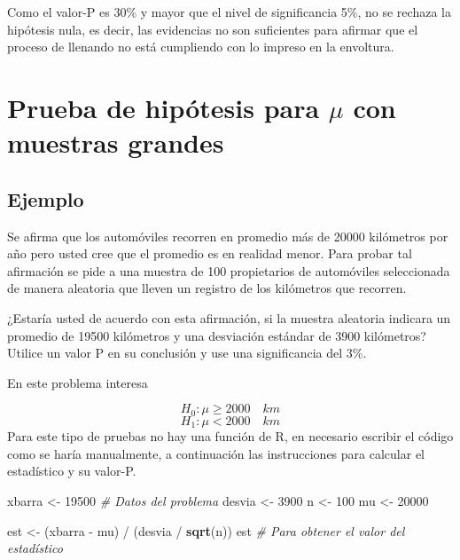 \documentclass[10pt,]{krantz}
\makeatletter
\newenvironment{Shaded}{\begin{snugshade}}{\end{snugshade}}
\newcommand{\KeywordTok}[1]{\textcolor[rgb]{0.13,0.29,0.53}{\textbf{{#1}}}}
\newcommand{\DecValTok}[1]{\textcolor[rgb]{0.00,0.00,0.81}{{#1}}}
\newcommand{\StringTok}[1]{\textcolor[rgb]{0.31,0.60,0.02}{{#1}}}
\newcommand{\CommentTok}[1]{\textcolor[rgb]{0.56,0.35,0.01}{\textit{{#1}}}}
\newcommand{\NormalTok}[1]{{#1}}
\let\proglang=\textsf
\newenvironment{kframe}{%
\medskip{}
\setlength{\fboxsep}{.8em}
 \def\at@end@of@kframe{}%
 \ifinner\ifhmode%
  \def\at@end@of@kframe{\end{minipage}}%
  \begin{minipage}{\columnwidth}%
 \fi\fi%
 \def\FrameCommand##1{\hskip\@totalleftmargin \hskip-\fboxsep
 \colorbox{shadecolor}{##1}\hskip-\fboxsep
     \hskip-\linewidth \hskip-\@totalleftmargin \hskip\columnwidth}%
 \MakeFramed {\advance\hsize-\width
   \@totalleftmargin\z@ \linewidth\hsize
   \@setminipage}}%
 {\par\unskip\endMakeFramed%
 \at@end@of@kframe}
\renewenvironment{Shaded}{\begin{kframe}}{\end{kframe}}
\makeatother
\begin{document}
Como el valor-P es 30\% y mayor que el nivel de significancia 5\%, no se
rechaza la hipótesis nula, es decir, las evidencias no son suficientes
para afirmar que el proceso de llenando no está cumpliendo con lo
impreso en la envoltura.

\section{\texorpdfstring{Prueba de hipótesis para \(\mu\) con muestras
grandes}{Prueba de hipótesis para \textbackslash{}mu con muestras grandes}}\label{prueba-de-hipotesis-para-mu-con-muestras-grandes}

\subsection*{Ejemplo}\label{ejemplo-62}


Se afirma que los automóviles recorren en promedio más de 20000
kilómetros por año pero usted cree que el promedio es en realidad menor.
Para probar tal afirmación se pide a una muestra de 100 propietarios de
automóviles seleccionada de manera aleatoria que lleven un registro de
los kilómetros que recorren.

¿Estaría usted de acuerdo con esta afirmación, si la muestra aleatoria
indicara un promedio de 19500 kilómetros y una desviación estándar de
3900 kilómetros? Utilice un valor P en su conclusión y use una
significancia del 3\%.

En este problema interesa

\[H_0: \mu \ge 2000 \quad km\] \[H_1: \mu < 2000 \quad km\] Para este
tipo de pruebas no hay una función de \proglang{R}, en necesario
escribir el código como se haría manualmente, a continuación las
instrucciones para calcular el estadístico y su valor-P.

\begin{Shaded}
\begin{Highlighting}[]
\NormalTok{xbarra <-}\StringTok{ }\DecValTok{19500}  \CommentTok{# Datos del problema}
\NormalTok{desvia <-}\StringTok{ }\DecValTok{3900}
\NormalTok{n <-}\StringTok{ }\DecValTok{100}
\NormalTok{mu <-}\StringTok{ }\DecValTok{20000}

\NormalTok{est <-}\StringTok{ }\NormalTok{(xbarra -}\StringTok{ }\NormalTok{mu) /}\StringTok{ }\NormalTok{(desvia /}\StringTok{ }\KeywordTok{sqrt}\NormalTok{(n))}
\NormalTok{est  }\CommentTok{# Para obtener el valor del estadístico}
\end{Highlighting}
\end{Shaded}
\end{document}
